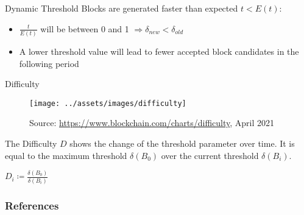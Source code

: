 \documentclass[]{beamer}
\begin{document}
\begin{frame}{Dynamic Threshold}
	Blocks are generated faster than expected $t < E(t)$:
	\begin{itemize}
		\item $\frac{t}{E(t)}$ will be between 0 and 1 $\Rightarrow \delta_{new} < \delta_{old}$
		\item A lower threshold value will lead to fewer accepted block candidates in the following period
	\end{itemize}


\end{frame}

\begin{frame}{Difficulty}
	\begin{figure}[t]
		\texttt{[image: ../assets/images/difficulty]}
		
		\tiny Source: \link \url{https://www.blockchain.com/charts/difficulty}, April 2021
	\end{figure}
	
	
	
	The Difficulty $D$ shows the change of the threshold parameter over time. It is equal to the maximum threshold $\delta(B_0)$ over the current threshold $\delta(B_i)$.
	\begin{center}
		$D_i \coloneqq \frac{\delta(B_0)}{\delta(B_i)}$
	\end{center}
\end{frame}

\begin{frame}%
	\frametitle{References}
	
	
\end{frame}
\end{document}
